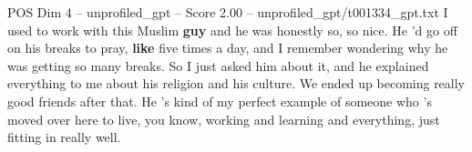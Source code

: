 \begin{textsample}{POS Dim 4 – unprofiled\_gpt – Score 2.00 – unprofiled\_gpt/t001334\_gpt.txt}  \label{ex:f4_pos_027}
I used to work with this Muslim \textbf{guy} and he was honestly so, so nice.
He ’d go off on his breaks to pray, \textbf{like} five times a day, and I remember wondering why he was getting so many breaks.
So I just asked him about it, and he explained everything to me about his religion and his culture.
We ended up becoming really good friends after that.
He ’s kind of my perfect example of someone who ’s moved over here to live, you know, working and learning and everything, just fitting in really well.

\end{textsample}
